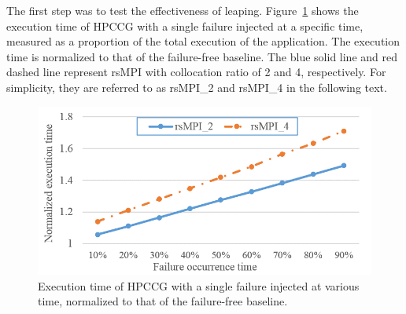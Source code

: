 The first step was to test the effectiveness of leaping. %
Figure~\ref{fig:single_failure} shows the execution time of HPCCG with a single failure injected at a specific time, measured as a proportion of the total execution of the application. %
The execution time is normalized to that of the failure-free baseline.   
The blue solid line and red dashed line represent rsMPI with collocation ratio of 2 and 4, respectively. For simplicity, they are referred to as rsMPI\_2 and rsMPI\_4 in the following text.  

\begin{figure}[!t]
  \begin{center}
      \includegraphics[width=0.9\columnwidth]{figures/single_failure_hpcc}
  \end{center}
  \vskip -0.2in
  \caption{Execution time of HPCCG with a single failure injected at various time, normalized to that of the failure-free baseline.}
  \label{fig:single_failure}
\end{figure}

